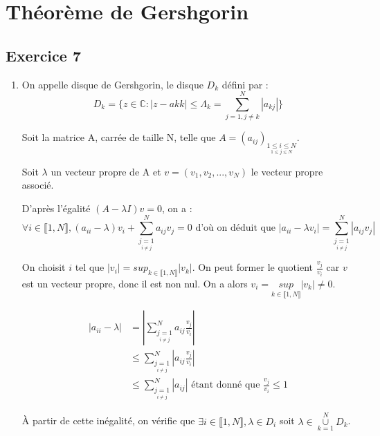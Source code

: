 \documentclass[a4paper,11pt]{article}
\newcommand{\C}{\mathbb{C}}
\theoremstyle{nonumberplain}
\theoremstyle{nonumberplain}
\begin{document}
\section{Théorème de Gershgorin}

\subsection*{Exercice 7}

    \begin{enumerate}
        \setlength\itemsep{2em}
        \item
        On appelle disque de Gershgorin, le disque $D_{k}$ défini par :
        $$D_{k} = \{ z \in \C : |z - a{kk}| \leq \Lambda_{k} = \sum\limits_{j=1, j\ne k}^{N} |a_{kj}| \}$$

        Soit la matrice A, carrée de taille N, telle que $A = (a_{ij})_{\underset {1 \leq j \leq N}{1 \leq i \leq N}}$.

        Soit $\lambda$ un vecteur propre de A et $v = (v_1, v_2, ..., v_N)$ le vecteur propre associé.

        D'après l'égalité $(A - \lambda I)v = 0$, on a :
        $$\forall i \in \llbracket 1 , N \rrbracket, (a_{ii} - \lambda)v_i + \sum\limits_{\underset{i \ne j}{j = 1}}^{N} a_{ij}v_j = 0 \text{ d'où on déduit que } |a_{ii} - \lambda v_{i}| = \sum\limits_{\underset{i \ne j}{j = 1}}^{N} |a_{ij}v_j|$$

        On choisit $i$ tel que $|v_{i}| = sup_{k \in \llbracket 1 , N \rrbracket} |v_{k}|$. On peut former le quotient $\frac{v_j}{v_{i}}$ car $v$ est un
        vecteur propre, donc il est non nul. On a alors $v_{i} = \underset{k \in \llbracket 1 , N \rrbracket}{sup} |v_{k}| \ne 0$.

        \begin{equation*}
            \begin{split}
                |a_{ii} - \lambda|  & = |\sum\limits_{\underset{i \ne j}{j = 1}}^{N} a_{ij} \frac{v_j}{v_{i}}| \\
                                    & \leq \sum\limits_{\underset{i \ne j}{j = 1}}^{N} |a_{ij} \frac{v_j}{v_{i}}| \\
                                    & \leq \sum\limits_{\underset{i \ne j}{j = 1}}^{N} |a_{ij}| \text{ étant donné que } \frac{v_j}{v_{i}} \leq 1
            \end{split}
        \end{equation*}

        \`{A} partir de cette inégalité, on vérifie que $\exists i \in \llbracket 1 , N \rrbracket,  \lambda \in D_{i}$ soit $\lambda \in \underset{k = 1}{\overset{N}{\cup}} D_{k}$.


\end{enumerate}
\end{document}
